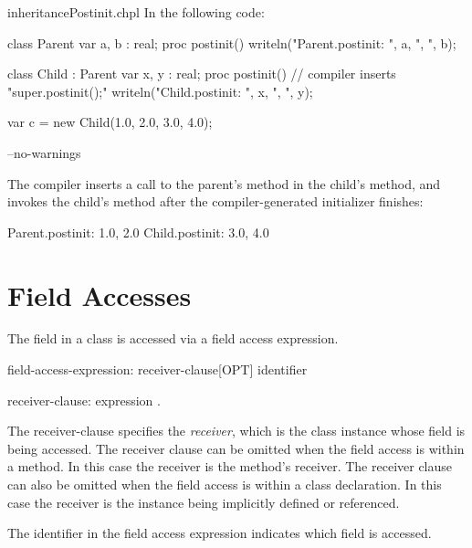 \begin{chapelexample}{inheritancePostinit.chpl}
In the following code:
\begin{chapel}
class Parent {
  var a, b : real;
  proc postinit() {
    writeln("Parent.postinit: ", a, ", ", b);
  }
}

class Child : Parent {
  var x, y : real;
  proc postinit() {
    // compiler inserts "super.postinit();"
    writeln("Child.postinit: ", x, ", ", y);
  }
}

var c = new Child(1.0, 2.0, 3.0, 4.0);
\end{chapel}
\begin{chapelcompopts}
--no-warnings
\end{chapelcompopts}
The compiler inserts a call to the parent's  method in the
child's  method, and invokes the child's  method
after the compiler-generated initializer finishes:
\begin{chapelprintoutput}{}
Parent.postinit: 1.0, 2.0
Child.postinit: 3.0, 4.0
\end{chapelprintoutput}
\end{chapelexample}

\section{Field Accesses}
\label{Class_Field_Accesses}

The field in a class is accessed via a field access expression.

\begin{syntax}
field-access-expression:
  receiver-clause[OPT] identifier

receiver-clause:
  expression .
\end{syntax}

The receiver-clause specifies the \emph{receiver}, which is the class
instance whose field is being accessed.
The receiver clause can be omitted when the field access is within a method.
In this case the receiver is the method's receiver.
The receiver clause can also be omitted when the field access is within
a class declaration. In this case the receiver is the instance
being implicitly defined or referenced.

The identifier in the field access expression indicates which field is accessed.

